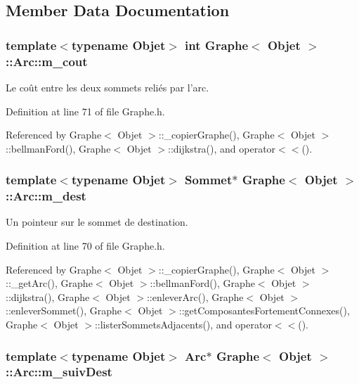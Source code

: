 \subsection{Member Data Documentation}
\hypertarget{class_graphe_1_1_arc_a7db3231570655fd43acc6be1a228b74c}{
\subsubsection[{m\_\-cout}]{\setlength{\rightskip}{0pt plus 5cm}template$<$typename Objet$>$ int {\bf Graphe}$<$ Objet $>$::{\bf Arc::m\_\-cout}}}
\label{class_graphe_1_1_arc_a7db3231570655fd43acc6be1a228b74c}


Le coût entre les deux sommets reliés par l'arc. 



Definition at line 71 of file Graphe.h.



Referenced by Graphe$<$ Objet $>$::\_\-copierGraphe(), Graphe$<$ Objet $>$::bellmanFord(), Graphe$<$ Objet $>$::dijkstra(), and operator$<$$<$().

\hypertarget{class_graphe_1_1_arc_a9d1f11eb639df5e712b859b95d8c6d15}{
\subsubsection[{m\_\-dest}]{\setlength{\rightskip}{0pt plus 5cm}template$<$typename Objet$>$ {\bf Sommet}$\ast$ {\bf Graphe}$<$ Objet $>$::{\bf Arc::m\_\-dest}}}
\label{class_graphe_1_1_arc_a9d1f11eb639df5e712b859b95d8c6d15}


Un pointeur sur le sommet de destination. 



Definition at line 70 of file Graphe.h.



Referenced by Graphe$<$ Objet $>$::\_\-copierGraphe(), Graphe$<$ Objet $>$::\_\-getArc(), Graphe$<$ Objet $>$::bellmanFord(), Graphe$<$ Objet $>$::dijkstra(), Graphe$<$ Objet $>$::enleverArc(), Graphe$<$ Objet $>$::enleverSommet(), Graphe$<$ Objet $>$::getComposantesFortementConnexes(), Graphe$<$ Objet $>$::listerSommetsAdjacents(), and operator$<$$<$().

\hypertarget{class_graphe_1_1_arc_a48a25d83dfc9f2230050c40939a1cbe9}{
\subsubsection[{m\_\-suivDest}]{\setlength{\rightskip}{0pt plus 5cm}template$<$typename Objet$>$ {\bf Arc}$\ast$ {\bf Graphe}$<$ Objet $>$::{\bf Arc::m\_\-suivDest}}}
\label{class_graphe_1_1_arc_a48a25d83dfc9f2230050c40939a1cbe9}


